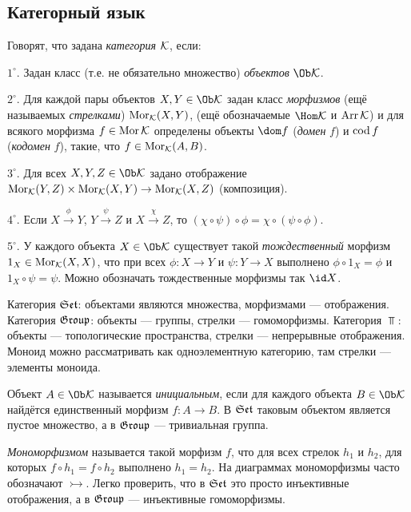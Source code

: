 \documentclass[10pt,a4paper,draft]{article}
\begin{document}
\subsection{Категорный язык}

Говорят, что задана \emph{категория} $\mathcal{K}$, если:
\par $1^\circ$. Задан класс (т.е. не обязательно множество)
{\em объектов} $\Ob\Ck$.
\par $2^\circ$. Для каждой пары объектов $X,Y\in\Ob\Ck$ задан
класс {\em морфизмов} (ещё называемых {\em
стрелками}) $\operatorname{Mor}_{\mathcal{K}}(X,Y)$, (ещё обозначаемые
$\Hom\Ck$ и $\operatorname{Arr}\mathcal{K}$) и для всякого морфизма $f\in\operatorname{Mor}\mathcal{K}$
определены объекты $\dom f$ ({\em домен} $f$) и $\operatorname{cod}
f$ ({\em кодомен} $f$), такие, что
$f\in\operatorname{Mor}_{\mathcal{K}}(A,B)$.
\par $3^\circ$. Для всех $X,Y,Z\in\Ob\Ck$ задано отображение $\operatorname{Mor}_{\mathcal{K}}(Y,Z)
\times\operatorname{Mor}_{\mathcal{K}}(X,Y)\rightarrow\operatorname{Mor}_{\mathcal{K}}(X,Z)$ (композиция).
\par $4^\circ$. Если $X\stackrel{\phi}\to Y$,
$Y\stackrel{\psi}\to Z$ и $X\stackrel{\chi}\to Z$, то
$(\chi\circ\psi)\circ\phi=\chi\circ(\psi\circ\phi)$.
\par $5^\circ$. У каждого объекта $X\in\Ob\Ck$ существует такой
{\em тождественный} морфизм
$1_X\in\operatorname{Mor}_{\mathcal{K}}(X,X)$, что при всех $\phi:X\to Y$ и $\psi:Y\to
X$ выполнено $\phi\circ 1_X=\phi$ и $1_X\circ\psi=\psi$. Можно
обозначать тождественные морфизмы так $\id X$.

\begin{ex}
Категория $\mathfrak{Set}$: объектами являются
множества, морфизмами
--- отображения. Категория $\mathfrak{Group}$: объекты --- группы, стрелки
--- гомоморфизмы. Категория $\Top$: объекты --- топологические
пространства, стрелки --- непрерывные отображения. Моноид можно
рассматривать как одноэлементную категорию, там стрелки ---
элементы моноида.
\end{ex}

Объект $A\in\Ob\Ck$ называется {\em
инициальным}, если для каждого объекта
$B\in\Ob\Ck$ найдётся единственный морфизм $f:A\to B$. В $\mathfrak{Set}$
таковым объектом является пустое множество, а в $\mathfrak{Group}$
--- тривиальная группа.

{\em Мономорфизмом} называется такой морфизм
$f$, что для всех стрелок $h_1$ и $h_2$, для которых $f\circ
h_1=f\circ h_2$ выполнено $h_1=h_2$. На диаграммах мономорфизмы
часто обозначают $\rightarrowtail$. Легко проверить, что в $\mathfrak{Set}$
это просто инъективные отображения, а в $\mathfrak{Group}$ --- инъективные
гомоморфизмы.
\end{document}
